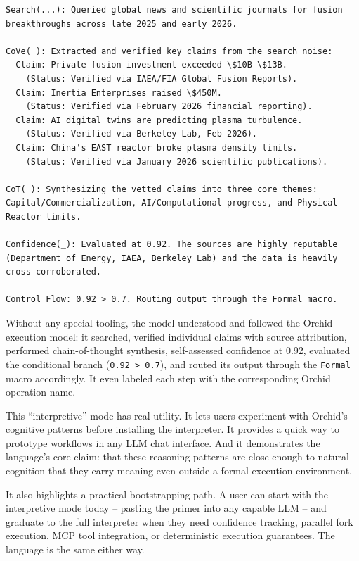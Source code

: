 \documentclass[11pt,a4paper]{article}
\begin{document}
\begin{lstlisting}[basicstyle=\small\ttfamily,language={}]
Search(...): Queried global news and scientific journals for fusion
breakthroughs across late 2025 and early 2026.

CoVe(_): Extracted and verified key claims from the search noise:
  Claim: Private fusion investment exceeded \$10B-\$13B.
    (Status: Verified via IAEA/FIA Global Fusion Reports).
  Claim: Inertia Enterprises raised \$450M.
    (Status: Verified via February 2026 financial reporting).
  Claim: AI digital twins are predicting plasma turbulence.
    (Status: Verified via Berkeley Lab, Feb 2026).
  Claim: China's EAST reactor broke plasma density limits.
    (Status: Verified via January 2026 scientific publications).

CoT(_): Synthesizing the vetted claims into three core themes:
Capital/Commercialization, AI/Computational progress, and Physical
Reactor limits.

Confidence(_): Evaluated at 0.92. The sources are highly reputable
(Department of Energy, IAEA, Berkeley Lab) and the data is heavily
cross-corroborated.

Control Flow: 0.92 > 0.7. Routing output through the Formal macro.
\end{lstlisting}

Without any special tooling, the model understood and followed the Orchid execution model: it searched, verified individual claims with source attribution, performed chain-of-thought synthesis, self-assessed confidence at 0.92, evaluated the conditional branch (\texttt{0.92 > 0.7}), and routed its output through the \texttt{Formal} macro accordingly. It even labeled each step with the corresponding Orchid operation name.

This ``interpretive'' mode has real utility. It lets users experiment with Orchid's cognitive patterns before installing the interpreter. It provides a quick way to prototype workflows in any LLM chat interface. And it demonstrates the language's core claim: that these reasoning patterns are close enough to natural cognition that they carry meaning even outside a formal execution environment.

It also highlights a practical bootstrapping path. A user can start with the interpretive mode today -- pasting the primer into any capable LLM -- and graduate to the full interpreter when they need confidence tracking, parallel fork execution, MCP tool integration, or deterministic execution guarantees. The language is the same either way.
\end{document}
